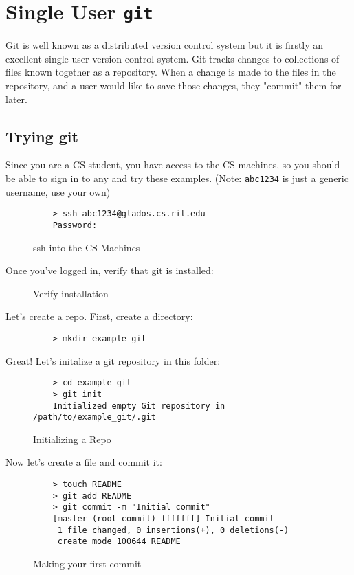 \documentclass[11pt]{report}
\begin{document}
\chapter{Single User \texttt{git}}
Git is well known as a distributed version control system but it is
firstly an excellent single user version control system. 
Git tracks changes to collections of files known together as a repository.
When a change is made to the files in the repository, and a user would like
to save those changes, they "commit" them for later.

\section{Trying git}
Since you are a CS student,
you have access to the CS machines, so you should be able to sign in to any and
try these examples. (Note: \texttt{abc1234} is just a generic username, use your own)

\begin{figure}[H]
  \caption{ssh into the CS Machines}
  \begin{lstlisting}
    > ssh abc1234@glados.cs.rit.edu
    Password:
  \end{lstlisting}
\end{figure}

Once you've logged in, verify that git is installed:

\begin{figure}[H]\end{figure}
\begin{figure}[H]\caption{Verify installation}\end{figure}

Let's create a repo. First, create a directory:
\begin{figure}[H]
  \begin{lstlisting}
    > mkdir example_git
  \end{lstlisting}
\end{figure}

Great! Let's initalize a git repository in this folder:
\begin{figure}[H]
  \caption{Initializing a Repo}
  \begin{lstlisting}
    > cd example_git
    > git init
    Initialized empty Git repository in /path/to/example_git/.git
  \end{lstlisting}
\end{figure}

Now let's create a file and commit it:
\begin{figure}[H]
  \caption{Making your first commit}
  \begin{lstlisting}
    > touch README
    > git add README
    > git commit -m "Initial commit"
    [master (root-commit) fffffff] Initial commit
     1 file changed, 0 insertions(+), 0 deletions(-)
     create mode 100644 README
  \end{lstlisting}
\end{figure}
\end{document}
